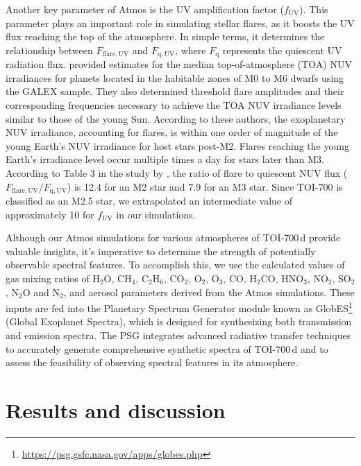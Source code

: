 Another key parameter of Atmos is the UV amplification factor ($f_\mathrm{UV}$). This parameter plays an important role in simulating stellar flares, as it boosts the UV flux reaching the top of the atmosphere. In simple terms, it determines the relationship between $F_\mathrm{flare,UV}$ and $F_\mathrm{q,UV}$, where $F_\mathrm{q}$ represents the quiescent UV radiation flux. \cite{Rekhi.et.al.2023ApJ...955...24R} provided estimates for the median  top-of-atmosphere (TOA) NUV irradiances for planets located in the habitable zones of M0 to M6 dwarfs using the GALEX sample. They also determined threshold flare amplitudes and their corresponding frequencies necessary to achieve the TOA NUV irradiance levels similar to those of the young Sun. According to these authors, the exoplanetary NUV irradiance, accounting for flares, is within one order of magnitude of the young Earth's NUV irradiance for host stars post-M2. Flares reaching the young Earth's irradiance level occur multiple times a day for stars later than M3.
According to Table 3 in the study by \cite{Rekhi.et.al.2023ApJ...955...24R}, the ratio of flare to quiescent NUV flux ($F_\mathrm{flare,UV}/F_\mathrm{q,UV}$) is 12.4 for an M2 star and 7.9 for an M3 star. Since TOI-700 is classified as an M2.5 star, we extrapolated an intermediate value of approximately 10 for $f_\mathrm{UV}$ in our simulations.

Although our Atmos simulations for various atmospheres of TOI-700\,d  provide valuable insights, it's imperative to determine the strength of potentially observable spectral features. To accomplish this, we use the calculated values of gas mixing ratios of H$_2$O, CH$_4$, C$_2$H$_6$, CO$_2$, O$_2$, O$_3$, CO, H$_2$CO, HNO$_3$, NO$_2$, SO$_2$, N$_2$O and N$_2$, and aerosol parameters derived from the Atmos simulations. These inputs are fed into the Planetary Spectrum Generator \citep[PSG,][]{Villanueva.et.al.2018JQSRT.217...86V} module known as GlobES\footnote{\url{https://psg.gsfc.nasa.gov/apps/globes.php}} (Global Exoplanet Spectra), which is designed for synthesizing both transmission and emission spectra. The PSG integrates advanced radiative transfer techniques to accurately generate comprehensive synthetic spectra 
of TOI-700\,d and to assess the feasibility of observing spectral features in its atmosphere.

\section{Results and discussion} \label{sec:results}

